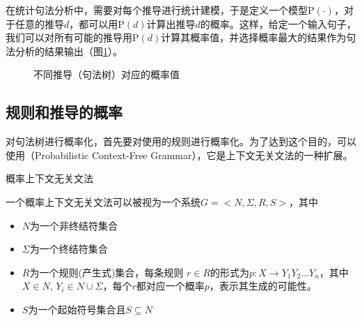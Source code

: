 \parinterval 在统计句法分析中，需要对每个推导进行统计建模，于是定义一个模型$\textrm{P}( \cdot )$，对于任意的推导$d$，都可以用$\textrm{P}(d)$计算出推导$d$的概率。这样，给定一个输入句子，我们可以对所有可能的推导用$\textrm{P}(d)$计算其概率值，并选择概率最大的结果作为句法分析的结果输出（图\ref{fig:2-25}）。

\begin{figure}[htp]
    \centering

	\caption{不同推导（句法树）对应的概率值}
    \label{fig:2-25}
\end{figure}



\subsection{规则和推导的概率}

\parinterval 对句法树进行概率化，首先要对使用的规则进行概率化。为了达到这个目的，可以使用{\small{}}（Probabilistic Context-Free Grammar），它是上下文无关文法的一种扩展。

\vspace{0.5em}
\begin{definition} 概率上下文无关文法

一个概率上下文无关文法可以被视为一个系统$G=<N,\Sigma,R,S>$，其中
\begin{itemize}
\vspace{0.5em}
\item $N$为一个非终结符集合
\vspace{0.5em}
\item $\Sigma$为一个终结符集合
\vspace{0.5em}
\item $R$为一个规则(产生式)集合，每条规则 $r \in R$的形式为$p:X \to Y_1Y_2...Y_n$，其中$X \in N$, $Y_i \in N \cup \Sigma$，每个$r$都对应一个概率$p$，表示其生成的可能性。
\vspace{0.5em}
\item $S$为一个起始符号集合且$S \subseteq N$
\vspace{0.5em}
\end{itemize}
\end{definition}

